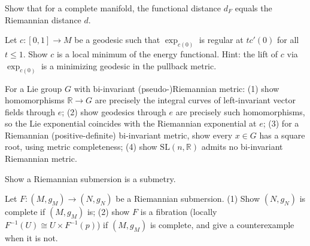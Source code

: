 \begin{remark}
  \label{rem:pet-ch5-ex-33}

  Show that for a complete manifold, the functional distance $d_F$ equals the
  Riemannian distance $d$.
\end{remark}

\begin{remark}
  \label{rem:pet-ch5-ex-34}

  Let $c:[0,1]\to M$ be a geodesic such that $\exp_{c(0)}$ is regular at $tc'(0)$
  for all $t\le1$. Show $c$ is a local minimum of the energy functional. Hint: the
  lift of $c$ via $\exp_{c(0)}$ is a minimizing geodesic in the pullback metric.
\end{remark}

\begin{remark}
  \label{rem:pet-ch5-ex-35}

  For a Lie group $G$ with bi-invariant (pseudo-)Riemannian metric: (1) show
  homomorphisms $\mathbb R\to G$ are precisely the integral curves of left-invariant
  vector fields through $e$; (2) show geodesics through $e$ are precisely such
  homomorphisms, so the Lie exponential coincides with the Riemannian exponential
  at $e$; (3) for a Riemannian (positive-definite) bi-invariant metric, show every
  $x\in G$ has a square root, using metric completeness; (4) show
  $\mathrm{SL}(n,\mathbb R)$ admits no bi-invariant Riemannian metric.
\end{remark}

\begin{remark}
  \label{rem:pet-ch5-ex-36}

  Show a Riemannian submersion is a submetry.
\end{remark}

\begin{remark}
  \label{rem:pet-ch5-ex-37}

  Let $F:(M,g_M)\to(N,g_N)$ be a Riemannian submersion. (1) Show $(N,g_N)$ is
  complete if $(M,g_M)$ is; (2) show $F$ is a fibration (locally
  $F^{-1}(U)\cong U\times F^{-1}(p)$) if $(M,g_M)$ is complete, and give a
  counterexample when it is not.
\end{remark}

